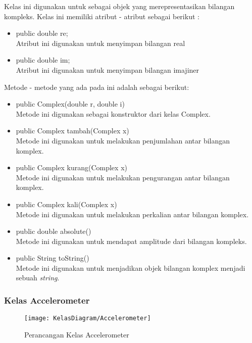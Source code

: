 Kelas ini digunakan untuk sebagai objek yang merepresentasikan bilangan kompleks. Kelas ini memiliki atribut - atribut sebagai berikut :
\begin{itemize}
	\item public double re; \\
		Atribut ini digunakan untuk menyimpan bilangan real
    \item public double im; \\
    	Atribut ini digunakan untuk menyimpan bilangan imajiner
\end{itemize}
Metode - metode yang ada pada ini adalah sebagai berikut:
\begin{itemize}
	\item public Complex(double r, double i) \\
		Metode ini digunakan sebagai konstruktor dari kelas Complex.
    \item public Complex tambah(Complex x) \\
    	Metode ini digunakan untuk melakukan penjumlahan antar bilangan komplex.
    \item public Complex kurang(Complex x) \\
    	Metode ini digunakan untuk melakukan pengurangan antar bilangan komplex.
    \item public Complex kali(Complex x)\\
    	Metode ini digunakan untuk melakukan perkalian antar bilangan komplex.
    \item public double absolute()\\
    	Metode ini digunakan untuk mendapat amplitude dari bilangan kompleks.
    \item public String toString()\\
    	Metode ini digunakan untuk menjadikan objek bilangan komplex menjadi sebuah {\it string}.
\end{itemize}

\subsubsection{Kelas Accelerometer}
\begin{figure}[H]
	\centering
	\texttt{[image: KelasDiagram/Accelerometer]}  
	\caption[Perancangan Kelas Accelerometer]{Perancangan Kelas Accelerometer} 
	\label{fig:KelasAccelerometer} 
\end{figure}

